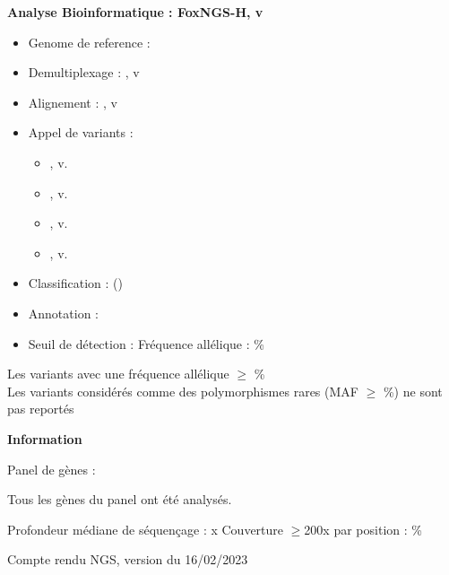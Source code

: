 \documentclass{letter}
\newcommand\tab[1][0.5cm]{\hspace*{#1}}
\begin{document}
    \textbf{Analyse Bioinformatique : FoxNGS-H, v\BioinfoFoxNGSVersion}
    \begin{itemize}[label={}]
        \item Genome de reference : \BioinfoGenome
        \item Demultiplexage : \BioinfoDemultiplexingTool, v\BioinfoDemultiplexingVersion
        \item Alignement : \BioinfoAlignmentTool, v\BioinfoAlignmentVersion
        \item Appel de variants : 
        \begin{itemize}
            \item \BioinfoVariantCallingATool, v.\BioinfoVariantCallingAVersion
            \item \BioinfoVariantCallingBTool, v.\BioinfoVariantCallingBVersion
            \item \BioinfoVariantCallingCTool,  v.\BioinfoVariantCallingCVersion
            \item\BioinfoVariantCallingDTool, v.\BioinfoVariantCallingDVersion
        \end{itemize}
        \item Classification : \BioinfoClassificationTool (\BioinfoClassificationVersion)
        \item Annotation : \BioinfoAnnotationList
        \item Seuil de d\'etection : Fr\'equence all\'elique : \BioinfoSeuilVAF\%
    \end{itemize}
        \begin{center}
            Les variants avec une fr\'equence all\'elique $\geq$ \BioinfoSeuilVAF\% \\
            Les variants consid\'er\'es comme des polymorphismes rares (MAF $\geq$ \BioinfoSeuilPolymorphism\%) ne sont pas report\'es
        \end{center}

    \bigskip
    
    \textbf{Information}

    Panel de g\`enes :
    
    
    Tous les g\`enes du panel ont \'et\'e analys\'es.
    
    Profondeur m\'ediane de s\'equençage : \MedianDepth x \tab Couverture $\ge$200x par position : \CoverageSEQDeuxCentX\%
    
    Compte rendu NGS, version du 16/02/2023
\end{document}
